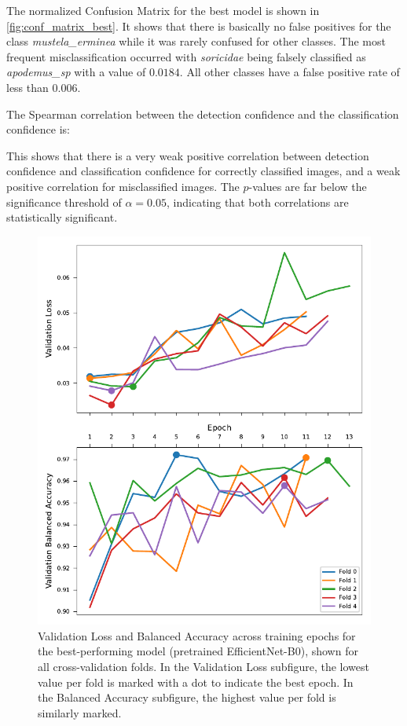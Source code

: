     The normalized Confusion Matrix for the best model is shown in \autoref{fig:conf_matrix_best}.
    It shows that there is basically no false positives for the class \textit{mustela\_erminea} while it was rarely confused for other classes.
    The most frequent misclassification occurred with \textit{soricidae} being falsely classified as \textit{apodemus\_sp} with a value of \(0.0184\).
    All other classes have a false positive rate of less than \(0.006\).

    The Spearman correlation between the detection confidence and the classification confidence is:

    
    
    This shows that there is a very weak positive correlation between detection confidence and classification confidence for correctly classified images, and a weak positive correlation for misclassified images.
    The $p$-values are far below the significance threshold of \( \alpha = 0.05 \), indicating that both correlations are statistically significant.

    

    \begin{figure}[ht]
    \centering
    \includegraphics{figures/training_metrics_best_model.pdf}
    \caption{Validation Loss and Balanced Accuracy across training epochs for the best-performing model (pretrained EfficientNet-B0), shown for all cross-validation folds. In the Validation Loss subfigure, the lowest value per fold is marked with a dot to indicate the best epoch. In the Balanced Accuracy subfigure, the highest value per fold is similarly marked.}
    \label{fig:training_metrics_best_model}
    \end{figure}    

